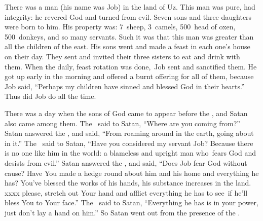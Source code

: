 
\begin{inparaenum}
   There was a man (his name was Job) in the land of Uz. This man was pure, had integrity: he revered God and turned from evil.%
   Seven sons and three daughters were born to him.%
   His property was: 7~sheep, 3~camels, 500~head of oxen, 500~donkeys, and so many servants. Such it was that this man was greater than all the children of the east.%
   His sons went and made a feast in each one's house on their day. They sent and invited their three sisters to eat and drink with them.%
   When the daily, feast rotation was done,\understood\ Job sent and sanctified them. He got up early in the morning and offered a burnt offering for all of them, because Job said, ``Perhaps my children have sinned and blessed God in their hearts.'' Thus did Job do all the time.%
  
   There was a day when the sons of God came to appear before the \lord, and Satan also came among them.%
   The \lord\ said to Satan, ``Where are you coming from?'' Satan answered the \lord, and said, ``From roaming around in the earth, going about in it.''%
   The \lord\ said to Satan, ``Have you considered my servant Job? Because there is no one like him in the world: a blameless and upright man who\understood\ fears God and desists from evil.''%
   Satan answered the \lord, and said, ``Does Job fear God without cause?%
   Have You made a hedge round about him and his home and everything he has? You've blessed the works of his hands, his substance increases in the land.%
   xxxx please, stretch out Your hand and afflict everything he has to see\understood\ if he'll bless You to Your face.''%
   The \lord\ said to Satan, ``Everything he has is in your power, just don't lay a hand on him.'' So Satan went out from the presence of the \lord.%
  

\end{inparaenum}
